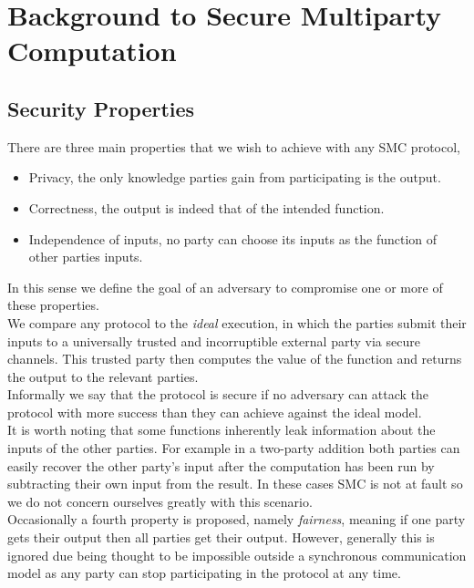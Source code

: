 \documentclass[ %
                    author={Nicholas Tutte},
                supervisor={Prof. Nigel Smart},
                    degree={MEng},
                     title={Secure Two Party Computation},
                  subtitle={A practical comparison of recent protocols},
                      type={Research - GG1K},
                      year={2015} ]{dissertation}
\begin{document}
	\chapter{Background to Secure Multiparty Computation} \label{sec:BG_toSMC}
		\section{Security Properties} \label{sub:SecurityProperties}
			There are three main properties that we wish to achieve with any SMC protocol,
			\begin{itemize}
				\item Privacy, the only knowledge parties gain from participating is the output.
				\item Correctness, the output is indeed that of the intended function.
				\item Independence of inputs, no party can choose its inputs as the function of other parties inputs.
			\end{itemize}

			In this sense we define the goal of an adversary to compromise one or more of these properties.\\

			We compare any protocol to the \emph{ideal} execution, in which the parties submit their inputs to a universally trusted and incorruptible external party via secure channels. This trusted party then computes the value of the function and returns the output to the relevant parties.\\

			Informally we say that the protocol is secure if no adversary can attack the protocol with more success than they can achieve against the ideal model.\\

			It is worth noting that some functions inherently leak information about the inputs of the other parties. For example in a two-party addition both parties can easily recover the other party's input after the computation has been run by subtracting their own input from the result. In these cases SMC is not at fault so we do not concern ourselves greatly with this scenario.\\

			Occasionally a fourth property is proposed, namely \emph{fairness}, meaning if one party gets their output then all parties get their output. However, generally this is ignored due being thought to be impossible outside a synchronous communication model as any party can stop participating in the protocol at any time.
\end{document}
